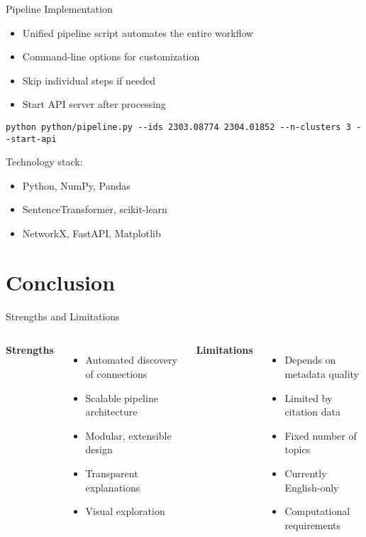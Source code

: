 \documentclass{beamer}
\begin{document}
\begin{frame}{Pipeline Implementation}
    \begin{itemize}
        \item Unified pipeline script automates the entire workflow
        \item Command-line options for customization
        \item Skip individual steps if needed
        \item Start API server after processing
    \end{itemize}
    
    \begin{lstlisting}[basicstyle=\tiny\ttfamily]
    python python/pipeline.py --ids 2303.08774 2304.01852 --n-clusters 3 --start-api
    \end{lstlisting}
    
    \vspace{0.3cm}
    Technology stack:
    \begin{itemize}
        \item Python, NumPy, Pandas
        \item SentenceTransformer, scikit-learn
        \item NetworkX, FastAPI, Matplotlib
    \end{itemize}
\end{frame}

\section{Conclusion}

\begin{frame}{Strengths and Limitations}
    \begin{columns}
        \textbf{Strengths}
        \begin{itemize}
            \item Automated discovery of connections
            \item Scalable pipeline architecture
            \item Modular, extensible design
            \item Transparent explanations
            \item Visual exploration
        \end{itemize}
        
        \textbf{Limitations}
        \begin{itemize}
            \item Depends on metadata quality
            \item Limited by citation data
            \item Fixed number of topics
            \item Currently English-only
            \item Computational requirements
        \end{itemize}
    \end{columns}
\end{frame}
\end{document}
